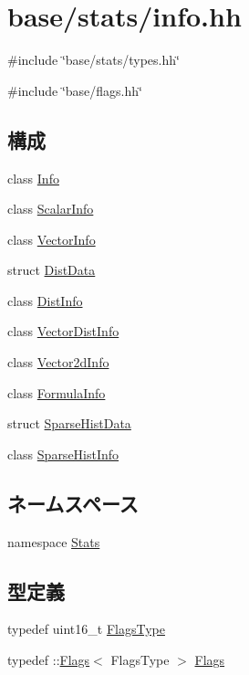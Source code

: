 \hypertarget{info_8hh}{
\section{base/stats/info.hh}
\label{info_8hh}
}
{\ttfamily \#include \char`\"{}base/stats/types.hh\char`\"{}}\par
{\ttfamily \#include \char`\"{}base/flags.hh\char`\"{}}\par
\subsection*{構成}
\begin{DoxyCompactItemize}
\item 
class \hyperlink{classStats_1_1Info}{Info}
\item 
class \hyperlink{classStats_1_1ScalarInfo}{ScalarInfo}
\item 
class \hyperlink{classStats_1_1VectorInfo}{VectorInfo}
\item 
struct \hyperlink{structStats_1_1DistData}{DistData}
\item 
class \hyperlink{classStats_1_1DistInfo}{DistInfo}
\item 
class \hyperlink{classStats_1_1VectorDistInfo}{VectorDistInfo}
\item 
class \hyperlink{classStats_1_1Vector2dInfo}{Vector2dInfo}
\item 
class \hyperlink{classStats_1_1FormulaInfo}{FormulaInfo}
\item 
struct \hyperlink{structStats_1_1SparseHistData}{SparseHistData}
\item 
class \hyperlink{classStats_1_1SparseHistInfo}{SparseHistInfo}
\end{DoxyCompactItemize}
\subsection*{ネームスペース}
\begin{DoxyCompactItemize}
\item 
namespace \hyperlink{namespaceStats}{Stats}
\end{DoxyCompactItemize}
\subsection*{型定義}
\begin{DoxyCompactItemize}
\item 
typedef uint16\_\-t \hyperlink{namespaceStats_ac52f827dcfea58febdc3860fd610dc09}{FlagsType}
\item 
typedef ::\hyperlink{classFlags}{Flags}$<$ FlagsType $>$ \hyperlink{namespaceStats_ad6cda6b0b8d7ddfbf8e769082577b482}{Flags}
\end{DoxyCompactItemize}
